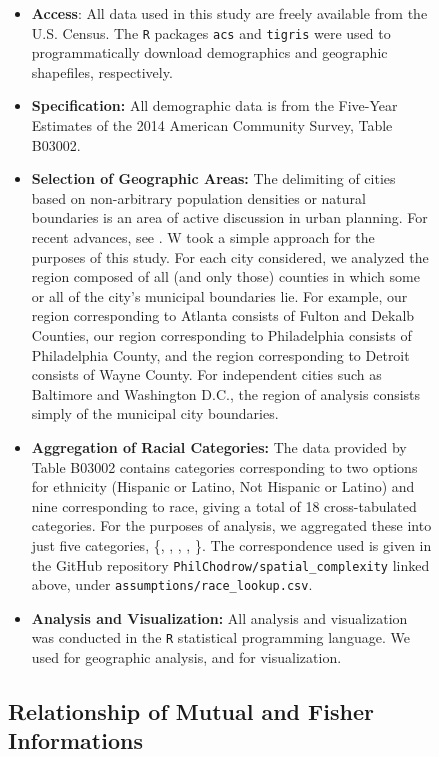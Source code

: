 \documentclass[english]{scrartcl}
\begin{document}
\begin{figure}
	\begin{itemize}
		\item \textbf{Access}: All data used in this study are freely available from the U.S. Census. The \texttt{R} packages \texttt{acs} and \texttt{tigris} were used to programmatically download demographics and geographic shapefiles, respectively.
		\item \textbf{Specification:} All demographic data is from the Five-Year Estimates of the 2014 American Community Survey, Table B03002. 
		\item \textbf{Selection of Geographic Areas:} The delimiting of cities based on non-arbitrary population densities or natural boundaries is an area of active discussion in urban planning. For recent advances, see \cite{Rozenfeld2008,Rozenfeld2011}. W took a simple approach for the purposes of this study. For each city considered, we analyzed the region composed of all (and only those) counties in which some or all of the city's municipal boundaries lie. For example, our region corresponding to Atlanta consists of Fulton and Dekalb Counties, our region corresponding to Philadelphia consists of Philadelphia County, and the region corresponding to Detroit consists of Wayne County. For independent cities such as Baltimore and Washington D.C., the region of analysis consists simply of the municipal city boundaries. 
		\item \textbf{Aggregation of Racial Categories:} The data provided by Table B03002 contains categories corresponding to two options for ethnicity (Hispanic or Latino, Not Hispanic or Latino) and nine corresponding to race, giving a total of 18 cross-tabulated categories. For the purposes of analysis, we aggregated these into just five categories, \{, , , , \}. The correspondence used is given in the GitHub repository \texttt{PhilChodrow/spatial\_complexity} linked above, under \texttt{assumptions/race\_lookup.csv}. 
		\item \textbf{Analysis and Visualization:} All analysis and visualization was conducted in the \texttt{R} statistical programming language. We used \cite{Bivand2014b,Bivand2014a,Bivand2014} for geographic analysis, and \cite{Wickham} for visualization.
	\end{itemize}

		

	\subsection*{Relationship of Mutual and Fisher Informations}


\end{figure}
\end{document}
